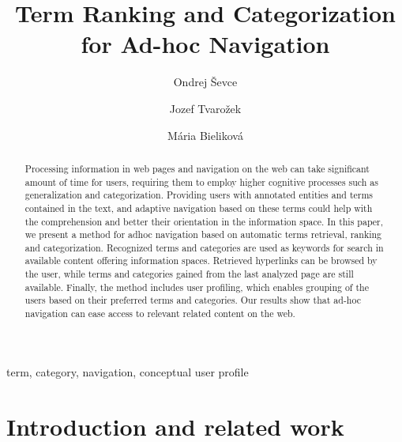 \documentclass{llncs}
\begin{document}
%

\title{Term Ranking and Categorization  for Ad-hoc Navigation}
%
\titlerunning{}  %
%
\author{Ondrej Ševce \and Jozef Tvarožek \and
Mária Bieliková}
%
\authorrunning{} %
%

\maketitle            

\begin{abstract}
Processing information in web pages and navigation on the web can take significant amount of time for users, requiring them to employ higher cognitive processes such as generalization and categorization. Providing users with annotated entities and terms contained in the text, and adaptive navigation based on these terms could help with the comprehension and better their orientation in the information space. In this paper, we present a method for adhoc navigation based on automatic terms retrieval, ranking and categorization. Recognized terms and categories are used as keywords for search in available content offering information spaces. Retrieved hyperlinks can be browsed by the user, while terms and categories gained from the last analyzed page are still available. Finally, the method includes user profiling, which enables grouping of the users based on their preferred terms and categories. Our results show that ad-hoc navigation can ease access to relevant related content on the web. 
\end{abstract}

\begin{center}
\begin{keywords}
term, category, navigation, conceptual user profile
\end{keywords}
\end{center}

\section{Introduction and related work}
\end{document}
